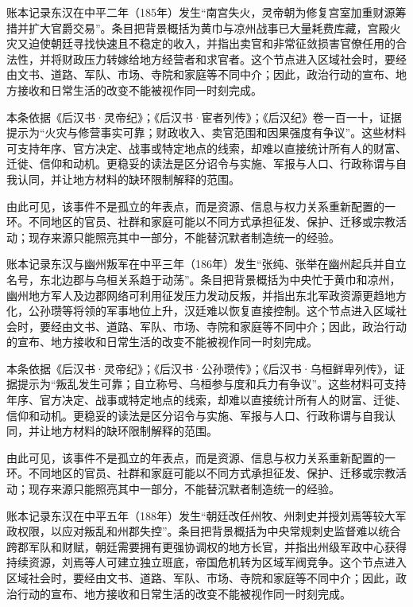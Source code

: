 账本记录东汉在中平二年（185年）发生“南宫失火，灵帝朝为修复宫室加重财源筹措并扩大官爵交易”。条目把背景概括为黄巾与凉州战事已大量耗费库藏，宫殿火灾又迫使朝廷寻找快速且不稳定的收入，并指出卖官和非常征敛损害官僚任用的合法性，并将财政压力转嫁给地方经营者和求官者。这个节点进入区域社会时，要经由文书、道路、军队、市场、寺院和家庭等不同中介；因此，政治行动的宣布、地方接收和日常生活的改变不能被视作同一时刻完成。

本条依据《后汉书·灵帝纪》；《后汉书·宦者列传》；《后汉纪》卷一百一十，证据提示为“火灾与修营事实可靠；财政收入、卖官范围和因果强度有争议”。这些材料可支持年序、官方决定、战事或特定地点的线索，却难以直接统计所有人的财富、迁徙、信仰和动机。更稳妥的读法是区分诏令与实施、军报与人口、行政称谓与自我认同，并让地方材料的缺环限制解释的范围。

由此可见，该事件不是孤立的年表点，而是资源、信息与权力关系重新配置的一环。不同地区的官员、社群和家庭可能以不同方式承担征发、保护、迁移或宗教活动；现存来源只能照亮其中一部分，不能替沉默者制造统一的经验。

账本记录东汉与幽州叛军在中平三年（186年）发生“张纯、张举在幽州起兵并自立名号，东北边郡与乌桓关系趋于动荡”。条目把背景概括为中央忙于黄巾和凉州，幽州地方军人及边郡网络可利用征发压力发动反叛，并指出东北军政资源更趋地方化，公孙瓒等将领的军事地位上升，汉廷难以恢复直接控制。这个节点进入区域社会时，要经由文书、道路、军队、市场、寺院和家庭等不同中介；因此，政治行动的宣布、地方接收和日常生活的改变不能被视作同一时刻完成。

本条依据《后汉书·灵帝纪》；《后汉书·公孙瓒传》；《后汉书·乌桓鲜卑列传》，证据提示为“叛乱发生可靠；自立称号、乌桓参与度和兵力有争议”。这些材料可支持年序、官方决定、战事或特定地点的线索，却难以直接统计所有人的财富、迁徙、信仰和动机。更稳妥的读法是区分诏令与实施、军报与人口、行政称谓与自我认同，并让地方材料的缺环限制解释的范围。

由此可见，该事件不是孤立的年表点，而是资源、信息与权力关系重新配置的一环。不同地区的官员、社群和家庭可能以不同方式承担征发、保护、迁移或宗教活动；现存来源只能照亮其中一部分，不能替沉默者制造统一的经验。

账本记录东汉在中平五年（188年）发生“朝廷改任州牧、州刺史并授刘焉等较大军政权限，以应对叛乱和州郡失控”。条目把背景概括为中央常规刺史监督难以统合跨郡军队和财赋，朝廷需要拥有更强协调权的地方长官，并指出州级军政中心获得持续资源，刘焉等人可建立独立班底，帝国危机转为区域军阀竞争。这个节点进入区域社会时，要经由文书、道路、军队、市场、寺院和家庭等不同中介；因此，政治行动的宣布、地方接收和日常生活的改变不能被视作同一时刻完成。

